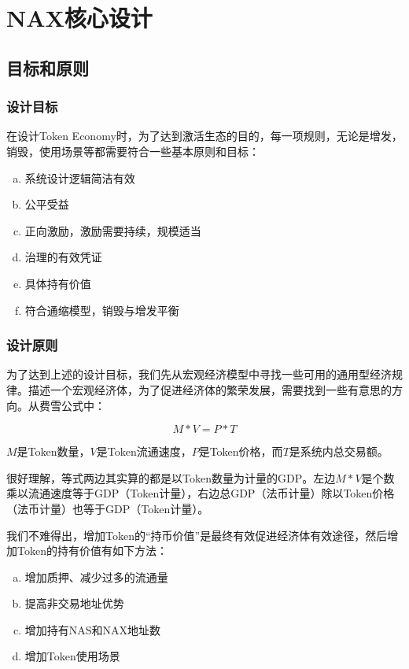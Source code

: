 \section{NAX核心设计}
\subsection{目标和原则}
\subsubsection{设计目标}
在设计Token Economy时，为了达到激活生态的目的，每一项规则，无论是增发，销毁，使用场景等都需要符合一些基本原则和目标：

\begin{enumerate}[a.]
	\item 系统设计逻辑简洁有效
	\item 公平受益
	\item 正向激励，激励需要持续，规模适当
        \item 治理的有效凭证
        \item 具体持有价值
        \item 符合通缩模型，销毁与增发平衡
\end{enumerate}

\subsubsection{设计原则}
为了达到上述的设计目标，我们先从宏观经济模型中寻找一些可用的通用型经济规律。描述一个宏观经济体，为了促进经济体的繁荣发展，需要找到一些有意思的方向。从费雪公式中：

\begin{equation}
M * V = P * T
\end{equation}

\(M\)是Token数量，\(V\)是Token流通速度，\(P\)是Token价格，而\(T\)是系统内总交易额。

很好理解，等式两边其实算的都是以Token数量为计量的GDP。左边\(M * V\)是个数乘以流通速度等于GDP（Token计量），右边总GDP（法币计量）除以Token价格（法币计量）也等于GDP（Token计量）。

我们不难得出，增加Token的“持币价值”是最终有效促进经济体有效途径，然后增加Token的持有价值有如下方法：

\begin{enumerate}[a.]
	\item 增加质押、减少过多的流通量
	\item 提高非交易地址优势
	\item 增加持有NAS和NAX地址数
	\item 增加Token使用场景
\end{enumerate}

